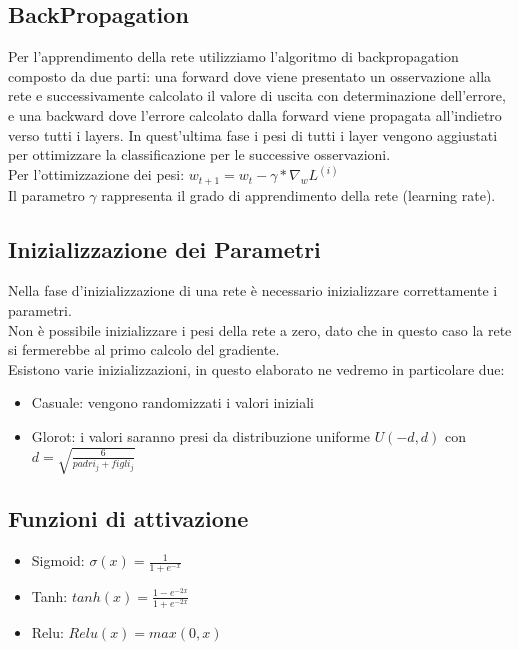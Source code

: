 \documentclass{article}
\begin{document}
        \subsection{BackPropagation}\label{subsec:backpropagation}
            Per l'apprendimento della rete utilizziamo l'algoritmo di backpropagation composto da due parti: una forward dove viene presentato un osservazione alla rete e successivamente calcolato il valore di uscita con determinazione dell'errore,
            e una backward dove l'errore calcolato dalla forward viene propagata all'indietro verso tutti i layers.
            In quest'ultima fase i pesi di tutti i layer vengono aggiustati per ottimizzare la classificazione per le successive osservazioni.\\
            Per l'ottimizzazione dei pesi: \begin{math} w_{t+1} = w_t - \gamma * \nabla_w L^{(i)}\end{math} \\
            Il parametro $\gamma$ rappresenta il grado di apprendimento della rete (learning rate).
        \subsection{Inizializzazione dei Parametri}\label{subsec:inizializzazione-dei-parametri}
            Nella fase d'inizializzazione di una rete è necessario inizializzare correttamente i parametri.\\
            Non è possibile inizializzare i pesi della rete a zero, dato che in questo caso la rete si fermerebbe al primo calcolo del gradiente.\\
            Esistono varie inizializzazioni, in questo elaborato ne vedremo in particolare due:
            \begin{itemize}
                \item Casuale: vengono randomizzati i valori iniziali
                \item Glorot: i valori saranno presi da distribuzione uniforme $U(-d, d)$ con $d=\sqrt{\frac{6}{padri_j + figli_j}}$
            \end{itemize}
        \subsection{Funzioni di attivazione}\label{subsec:funzioni-di-attivazione}
            \begin{itemize}
                \item Sigmoid: $\sigma(x) = \frac{1} {1 + e^{-x}}$
                \item Tanh: $tanh(x) = \frac{1 - e^{-2x}}{1 + e^{-2x}}$
                \item Relu: $Relu(x) = max(0, x)$
            \end{itemize}
\end{document}
